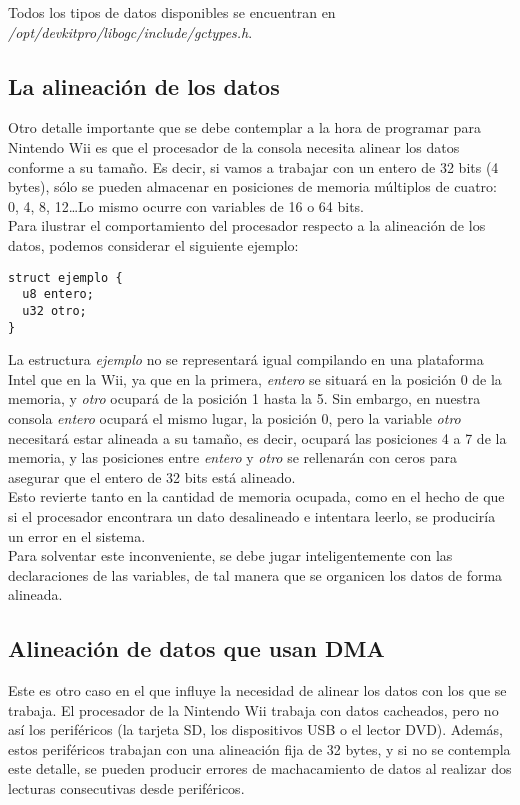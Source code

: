 Todos los tipos de datos disponibles se encuentran en \emph{/opt/devkitpro/libogc/include/gctypes.h}.

\subsection{La alineación de los datos}

Otro detalle importante que se debe contemplar a la hora de programar para Nintendo Wii es que el procesador de la consola necesita alinear los datos conforme a su tamaño. Es decir, si vamos a trabajar con un entero de 32 bits (4 bytes), sólo se pueden almacenar en posiciones de memoria múltiplos de cuatro: 0, 4, 8, 12\ldots Lo mismo ocurre con variables de 16 o 64 bits. \\

Para ilustrar el comportamiento del procesador respecto a la alineación de los datos, podemos considerar el siguiente ejemplo:

\begin{lstlisting}[style=C++]
struct ejemplo {
  u8 entero;
  u32 otro;
}
\end{lstlisting}

La estructura \emph{ejemplo} no se representará igual compilando en una plataforma Intel que en la Wii, ya que en la primera, \emph{entero} se situará en la posición 0 de la memoria, y \emph{otro} ocupará de la posición 1 hasta la 5. Sin embargo, en nuestra consola \emph{entero} ocupará el mismo lugar, la posición 0, pero la variable \emph{otro} necesitará estar alineada a su tamaño, es decir, ocupará las posiciones 4 a 7 de la memoria, y las posiciones entre \emph{entero} y \emph{otro} se rellenarán con ceros para asegurar que el entero de 32 bits está alineado. \\

Esto revierte tanto en la cantidad de memoria ocupada, como en el hecho de que si el procesador encontrara un dato desalineado e intentara leerlo, se produciría un error en el sistema. \\

Para solventar este inconveniente, se debe jugar inteligentemente con las declaraciones de las variables, de tal manera que se organicen los datos de forma alineada.

\subsection{Alineación de datos que usan DMA}

Este es otro caso en el que influye la necesidad de alinear los datos con los que se trabaja. El procesador de la Nintendo Wii trabaja con datos cacheados, pero no así los periféricos (la tarjeta SD, los dispositivos USB o el lector DVD). Además, estos periféricos trabajan con una alineación fija de 32 bytes, y si no se contempla este detalle, se pueden producir errores de machacamiento de datos al realizar dos lecturas consecutivas desde periféricos. \\

